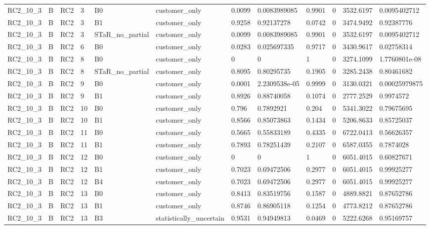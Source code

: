 \begin{longtable}{llllllllllll}
RC2\_10\_3 & B & RC2 & 3 & B0 & customer\_only & 0.0099 & 0.0083989085 & 0.9901 & 0 & 3532.6197 & 0.0095402712 \\
RC2\_10\_3 & B & RC2 & 3 & B1 & customer\_only & 0.9258 & 0.92137278 & 0.0742 & 0 & 3474.9492 & 0.92387776 \\
RC2\_10\_3 & B & RC2 & 3 & STaR\_no\_partial & customer\_only & 0.0099 & 0.0083989085 & 0.9901 & 0 & 3532.6197 & 0.0095402712 \\
RC2\_10\_3 & B & RC2 & 6 & B0 & customer\_only & 0.0283 & 0.025697335 & 0.9717 & 0 & 3430.9617 & 0.02758314 \\
RC2\_10\_3 & B & RC2 & 8 & B0 & customer\_only & 0 & 0 & 1 & 0 & 3274.1099 & 1.7760801e-08 \\
RC2\_10\_3 & B & RC2 & 8 & STaR\_no\_partial & customer\_only & 0.8095 & 0.80295735 & 0.1905 & 0 & 3285.2438 & 0.80461682 \\
RC2\_10\_3 & B & RC2 & 9 & B0 & customer\_only & 0.0001 & 2.2309538e-05 & 0.9999 & 0 & 3130.0321 & 0.00025979875 \\
RC2\_10\_3 & B & RC2 & 9 & B1 & customer\_only & 0.8926 & 0.88740058 & 0.1074 & 0 & 2777.2529 & 0.9974572 \\
RC2\_10\_3 & B & RC2 & 10 & B0 & customer\_only & 0.796 & 0.7892921 & 0.204 & 0 & 5341.3022 & 0.79675695 \\
RC2\_10\_3 & B & RC2 & 10 & B1 & customer\_only & 0.8566 & 0.85073863 & 0.1434 & 0 & 5206.8633 & 0.85725037 \\
RC2\_10\_3 & B & RC2 & 11 & B0 & customer\_only & 0.5665 & 0.55833189 & 0.4335 & 0 & 6722.0413 & 0.56626357 \\
RC2\_10\_3 & B & RC2 & 11 & B1 & customer\_only & 0.7893 & 0.78251439 & 0.2107 & 0 & 6587.0355 & 0.7874028 \\
RC2\_10\_3 & B & RC2 & 12 & B0 & customer\_only & 0 & 0 & 1 & 0 & 6051.4015 & 0.60827671 \\
RC2\_10\_3 & B & RC2 & 12 & B1 & customer\_only & 0.7023 & 0.69472506 & 0.2977 & 0 & 6051.4015 & 0.99925277 \\
RC2\_10\_3 & B & RC2 & 12 & B4 & customer\_only & 0.7023 & 0.69472506 & 0.2977 & 0 & 6051.4015 & 0.99925277 \\
RC2\_10\_3 & B & RC2 & 13 & B0 & customer\_only & 0.8413 & 0.83519756 & 0.1587 & 0 & 4889.8821 & 0.87652786 \\
RC2\_10\_3 & B & RC2 & 13 & B1 & customer\_only & 0.8746 & 0.86905118 & 0.1254 & 0 & 4773.8212 & 0.87652786 \\
RC2\_10\_3 & B & RC2 & 13 & B3 & statistically\_uncertain & 0.9531 & 0.94949813 & 0.0469 & 0 & 5222.6268 & 0.95169757 \\

\end{longtable}
